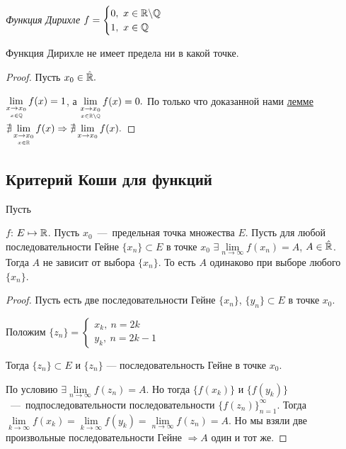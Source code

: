 \begin{definition}
    \textit{Функция Дирихле} $f = 
    \begin{cases}
        0, \ x \in \mathbb{R} \backslash \mathbb{Q} \\
        1, \ x \in \mathbb{Q} &
    \end{cases}
    $
\end{definition}
\begin{proposition}
    Функция Дирихле не имеет предела ни в какой точке.
\end{proposition}
\begin{proof}
    Пусть $x_{0} \in \Hat{\mathbb{R}}.$
    
    $\lim\limits_{\underset{x \in \mathbb{Q}}{x\to x_{0}}} f (x) = 1$, а $\lim\limits_{\underset{x \in \mathbb{R} \backslash \mathbb{Q}}{x\to x_{0}}} f (x) = 0.$ По только что доказанной нами \hyperlink{lemm4.2}{лемме} $\nexists \lim\limits_{\underset{x \in \mathbb{R}}{x\to x_{0}}} f (x) \Rightarrow \nexists \lim\limits_{x\to x_{0}} f (x).$
\end{proof}
\subsection{Критерий Коши для функций}
\begin{lemma}
    \hypertarget{lemm4.3}{Пусть} $f$: $E \mapsto \mathbb{R}$. Пусть $x_{0}$~---~предельная точка множества $E$. Пусть для любой последовательности Гейне $\{ x_{n} \} \subset E$ в точке $x_{0}$ $\exists \lim\limits_{n\to \infty} f (x_{n}) = A$, $A \in \Hat{\mathbb{R}}$. Тогда $A$ не зависит от выбора $\{ x_{n} \}$. То есть $A$ одинаково при выборе любого $\{ x_{n}\}$.
\end{lemma}
\begin{proof}
    Пусть есть две последовательности Гейне $\{ x_{n} \}$, $\{ y_{n} \} \subset E$ в точке $x_{0}$.

    Положим $\{ z_{n} \} =
    \begin{cases}
        x_{k}, \ n = 2k \\
        y_{k}, \ n = 2k - 1&
    \end{cases}  
    $

    Тогда $\{ z_{n} \} \subset E \text{ и $\{ z_{n} \}$~---~последовательность Гейне в точке } x_{0}.$ 
    
    По условию $\exists \lim\limits_{n\to \infty} f (z_{n}) = A.$ Но тогда $\{ f (x_{k}) \}$ и $\{ f (y_{k}) \}$~---~подпоследовательности последовательности $\{ f (z_{n}) \}^{\infty}_{n = 1}$. Тогда $\lim\limits_{k\to \infty} f (x_{k}) = \lim\limits_{k\to \infty} f (y_{k}) = \lim\limits_{n\to \infty} f (z_{n}) = A.$ Но мы взяли две произвольные последовательности Гейне $\Rightarrow A$ один и тот же.
\end{proof}